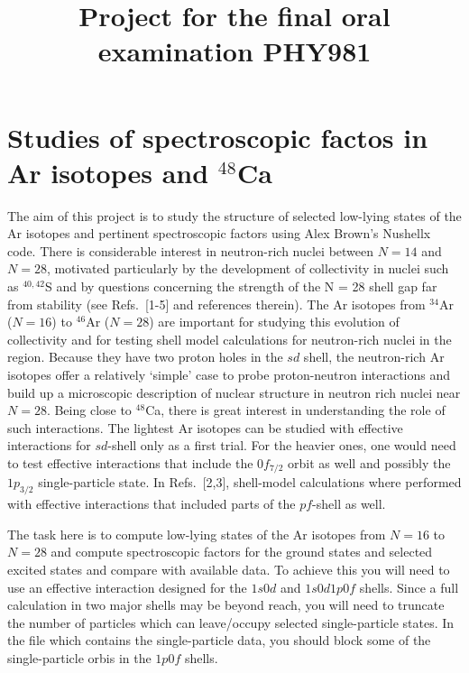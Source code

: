 \documentclass[prc]{revtex4}
\begin{document}
\title{Project for the final oral examination PHY981}
\maketitle
\section*{Studies of spectroscopic factos in Ar isotopes and $^{48}$Ca}

The aim of this project is to study the structure of selected low-lying states of the Ar isotopes and 
pertinent spectroscopic factors using Alex Brown's Nushellx code. 
There is considerable interest in neutron-rich nuclei between $N = 14$ and $N = 28$,
motivated particularly by the development of collectivity in nuclei such as
$^{40,42}$S and by questions
concerning the strength of the N = 28 shell gap far from stability (see Refs.~[1-5] and references
therein). The Ar isotopes from $^{34}$Ar ($N = 16$) to $^{46}$Ar ($N = 28$) are important for studying this
evolution of collectivity and for testing shell model calculations for neutron-rich nuclei in the
region. Because they have two proton holes in the $sd$ shell, the neutron-rich Ar isotopes offer a
relatively ‘simple’ case to probe proton-neutron interactions and build up a
microscopic description of nuclear structure in neutron rich nuclei near $N = 28$. Being close to $^{48}$Ca, there 
is great interest in understanding the role of such interactions.   
The lightest Ar isotopes can be studied with effective interactions for $sd$-shell only as a first trial. 
For the heavier ones, one would need to test 
effective interactions that include the $0f_{7/2}$ orbit as well and possibly the $1p_{3/2}$ single-particle state. 
In Refs.~[2,3], shell-model calculations where performed
with effective interactions that included parts of the $pf$-shell as well. 

The task here is to compute low-lying states of the Ar isotopes from
$N=16$ to $N=28$ and compute spectroscopic factors for the ground states and selected excited states
and compare with available data. To achieve this
you will need to use an effective interaction designed for the $1s0d$
and $1s0d1p0f$ shells. Since a full calculation in two major shells
may be beyond reach, you will need to truncate the number of particles
which can leave/occupy selected single-particle states. In the file
which contains the single-particle data, you should block some of the
single-particle orbis in the $1p0f$ shells.
\end{document}
